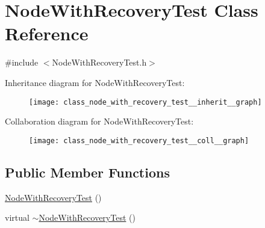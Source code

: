 \hypertarget{class_node_with_recovery_test}{}\section{Node\+With\+Recovery\+Test Class Reference}
\label{class_node_with_recovery_test}


{\ttfamily \#include $<$Node\+With\+Recovery\+Test.\+h$>$}



Inheritance diagram for Node\+With\+Recovery\+Test\+:\nopagebreak
\begin{figure}[H]
\begin{center}
\leavevmode
\texttt{[image: class\_node\_with\_recovery\_test\_\_inherit\_\_graph]}
\end{center}
\end{figure}


Collaboration diagram for Node\+With\+Recovery\+Test\+:\nopagebreak
\begin{figure}[H]
\begin{center}
\leavevmode
\texttt{[image: class\_node\_with\_recovery\_test\_\_coll\_\_graph]}
\end{center}
\end{figure}
\subsection*{Public Member Functions}
\begin{DoxyCompactItemize}
\item 
\hyperlink{class_node_with_recovery_test_ae8676a479a3ad761eb6cd5069575f51f}{Node\+With\+Recovery\+Test} ()
\item 
virtual \hyperlink{class_node_with_recovery_test_a91ac9cad83523696aee1a5c5718a62af}{$\sim$\+Node\+With\+Recovery\+Test} ()
\end{DoxyCompactItemize}
